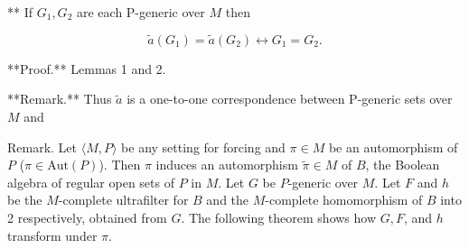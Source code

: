** If $G_1, G_2$ are each P-generic over $M$ then

$$\tilde{a}(G_1) = \tilde{a}(G_2) \leftrightarrow G_1 = G_2.$$

**Proof.** Lemmas 1 and 2.

**Remark.** Thus $\tilde{a}$ is a one-to-one correspondence between P-generic sets over $M$ and

Remark. Let $\langle M, P \rangle$ be any setting for forcing and $\pi \in M$ be an automorphism of $P$ ($\pi \in \text{Aut} (P)$). Then $\pi$ induces an automorphism $\tilde{\pi} \in M$ of $B$, the Boolean algebra of regular open sets of $P$ in $M$. Let $G$ be $P$-generic over $M$. Let $F$ and $h$ be the $M$-complete ultrafilter for $B$ and the $M$-complete homomorphism of $B$ into 2 respectively, obtained from $G$. The following theorem shows how $G, F$, and $h$ transform under $\pi$.
